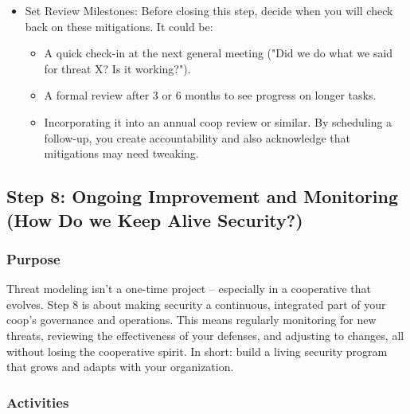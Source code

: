 \begin{itemize}
    \item Set Review Milestones: Before closing this step, decide when you will check back on these mitigations.
    It could be:
        \begin{itemize}   
            \item A quick check-in at the next general meeting ("Did we do what we said for threat X? Is it
    working?").
            \item A formal review after 3 or 6 months to see progress on longer tasks.
            \item Incorporating it into an annual coop review or similar. By scheduling a follow-up, you create
    accountability and also acknowledge that mitigations may need tweaking.
        \end{itemize}
    
    \end{itemize}

\subsection{Step 8: Ongoing Improvement and Monitoring (How Do we Keep Alive Security?)}
\label{subsec:Step8}

\subsubsection{Purpose}

Threat modeling isn't a one-time project – especially in a cooperative that
evolves. Step 8 is about making security a continuous, integrated part of your
coop's governance and operations. This means regularly monitoring for new
threats, reviewing the effectiveness of your defenses, and adjusting to changes,
all without losing the cooperative spirit. In short: build a living security
program that grows and adapts with your organization.

\subsubsection{Activities}

